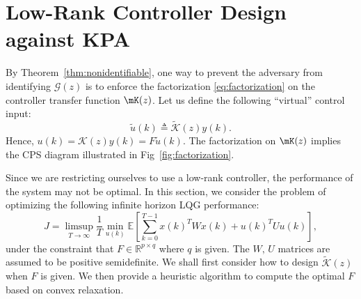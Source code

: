   \section{Low-Rank Controller Design against KPA}
  \label{sec:countermeasure}

  By Theorem~\ref{thm:nonidentifiable}, one way to prevent the adversary from identifying $\mathcal G(z)$ is to enforce the factorization \eqref{eq:factorization} on the controller transfer function $\mK(z)$. Let us define the following ``virtual'' control input:
  \begin{equation}
    \tilde u(k) \triangleq \tilde{\mathcal K}(z) y(k). 
    \label{eq:tildeudef}
  \end{equation}
  Hence, $u(k) = \mathcal K(z) y(k) =  F \tilde u(k)$. The factorization on $\mK(z)$ implies the CPS diagram illustrated in Fig~\ref{fig:factorization}.

  Since we are restricting ourselves to use a low-rank controller, the performance of the system may not be optimal. In this section, we consider the problem of optimizing the following infinite horizon LQG performance:
  \begin{equation}
    J = \limsup_{T\rightarrow \infty}\frac{1}{T}\min_{u(k)}\mathbb{E}\left[\sum_{k=0}^{T-1} x(k)^TWx(k)+u(k)^TUu(k)\right],
    \label{eq:lqgcost}
  \end{equation}
  under the constraint that $F \in \mathbb R^{p\times q}$ where $q$ is given. The $W,\,U$ matrices are assumed to be positive semidefinite. We shall first consider how to design $\tilde {\mathcal K}(z)$ when $F$ is given. We then provide a heuristic algorithm to compute the optimal $F$ based on convex relaxation.

